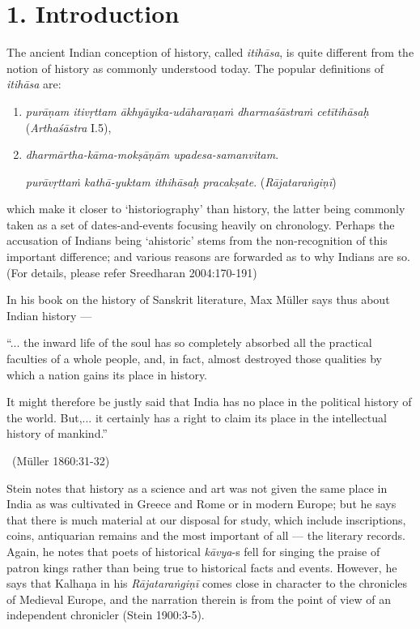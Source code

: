 \section*{1. Introduction}

The ancient Indian conception of history, called \textit{itihāsa}, is quite different from the notion of history as commonly understood today. The popular definitions of \textit{itihāsa} are:

\begin{enumerate}
\itemsep=0pt
\item \textit{purāṇam itivṛttam ākhyāyika-udāharaṇaṁ dharmaśāstraṁ cetītihāsaḥ} (\textit{Arthaśāstra} I.5),

 \item 
 \textit{dharmārtha-kāma-mokṣāṇām upadesa-samanvitam}.

 \textit{purāvṛttaṁ kathā-yuktam ithihāsaḥ pracakṣate}. (\textit{Rājataraṅgiṇī})

\end{enumerate}

which make it closer to ‘historiography’ than history, the latter being commonly taken as a set of dates-and-events focusing heavily on chronology. Perhaps the accusation of Indians being ‘ahistoric’ stems from the non-recognition of this important difference; and various reasons are forwarded as to why Indians are so. (For details, please refer Sreedharan 2004:170-191)

In his book on the history of Sanskrit literature, Max Müller says thus about Indian history —

\begin{myquote}
“... the inward life of the soul has so completely absorbed all the practical faculties of a whole people, and, in fact, almost destroyed those qualities by which a nation gains its place in history.
\end{myquote}

\begin{myquote}
It might therefore be justly said that India has no place in the political history of the world. But,... it certainly has a right to claim its place in the intellectual history of mankind.” 

~\hfill (Müller 1860:31-32)
\end{myquote}

Stein notes that history as a science and art was not given the same place in India as was cultivated in Greece and Rome or in modern Europe; but he says that there is much material at our disposal for study, which include inscriptions, coins, antiquarian remains and the most important of all — the literary records. Again, he notes that poets of historical \textit{kāvya}-s fell for singing the praise of patron kings rather than being true to historical facts and events. However, he says that Kalhaṇa in his \textit{Rājataraṅgiṇī} comes close in character to the chronicles of Medieval Europe, and the narration therein is from the point of view of an independent chronicler (Stein 1900:3-5).

